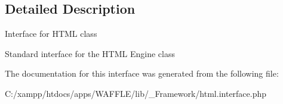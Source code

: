 \subsection{Detailed Description}
Interface for H\+T\+ML class

Standard interface for the H\+T\+ML Engine class 

The documentation for this interface was generated from the following file\+:\begin{DoxyCompactItemize}
\item 
C\+:/xampp/htdocs/apps/\+W\+A\+F\+F\+L\+E/lib/\+\_\+\+Framework/html.\+interface.\+php\end{DoxyCompactItemize}
